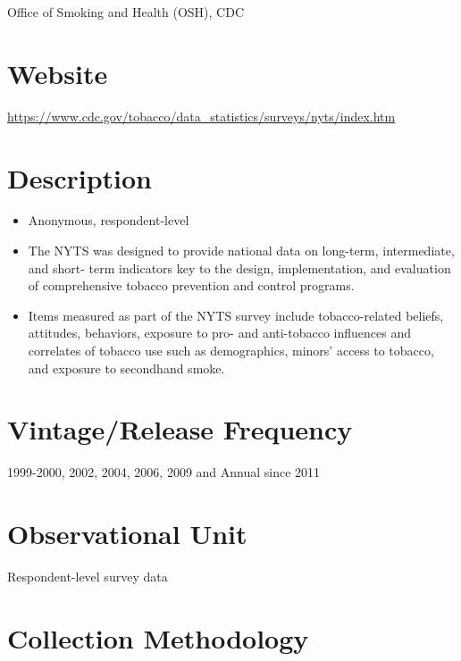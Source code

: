 \documentclass[
]{book}
\providecommand{\tightlist}{%
  \setlength{\itemsep}{0pt}\setlength{\parskip}{0pt}}
\begin{document}
Office of Smoking and Health (OSH), CDC

\hypertarget{website-67}{%
\section{Website}\label{website-67}}

\url{https://www.cdc.gov/tobacco/data_statistics/surveys/nyts/index.htm}

\hypertarget{description-67}{%
\section{Description}\label{description-67}}

\begin{itemize}
\tightlist
\item
  Anonymous, respondent-level
\item
  The NYTS was designed to provide national data on long-term, intermediate, and short- term indicators key to the design, implementation, and evaluation of comprehensive tobacco prevention and control programs.
\item
  Items measured as part of the NYTS survey include tobacco-related beliefs, attitudes, behaviors, exposure to pro- and anti-tobacco influences and correlates of tobacco use such as demographics, minors' access to tobacco, and exposure to secondhand smoke.
\end{itemize}

\hypertarget{vintagerelease-frequency-67}{%
\section{Vintage/Release Frequency}\label{vintagerelease-frequency-67}}

1999-2000, 2002, 2004, 2006, 2009 and Annual since 2011

\hypertarget{observational-unit-67}{%
\section{Observational Unit}\label{observational-unit-67}}

Respondent-level survey data

\hypertarget{collection-methodology-67}{%
\section{Collection Methodology}\label{collection-methodology-67}}
\end{document}
